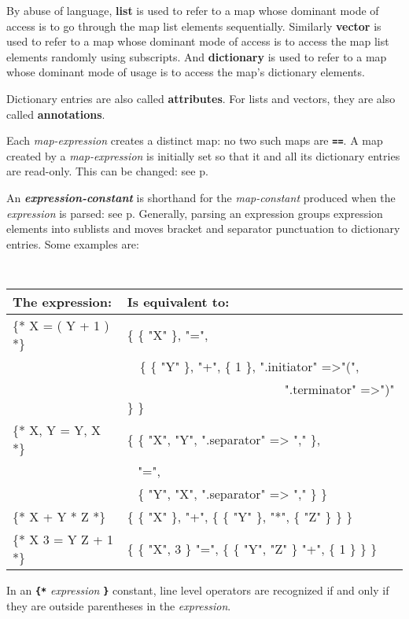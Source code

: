 \documentclass[12pt]{article}
\newcommand{\TT}[1]{{\tt \bfseries #1}}
\newcommand{\key}[1]{{\rm \bfseries #1}}
\newcommand{\emkey}[1]{{\em \bfseries #1}}
\newcommand{\skey}[2]{{\rm \bfseries #1#2}}
\newcommand{\pagref}[1]{p\pageref{#1}}
\begin{document}
By abuse of language, \key{list} is used to refer to a map whose
dominant mode of access is to go through the map list elements
sequentially.  Similarly \key{vector} is used to refer to a map whose
dominant mode of access is to access the map list elements randomly
using subscripts.  And \key{dictionary} is used to refer to a map
whose dominant mode of usage is to access the map's dictionary elements.

Dictionary entries are also called \skey{attribute}s.  For lists and
vectors, they are also called \skey{annotation}s.

Each {\em map-expression}
creates a distinct map: no two such maps are \TT{==}.  A map created
by a {\em map-expression} is initially set so that it and all its dictionary
entries are read-only.  This can be changed: see \pagref{READ-ONLY-MAP}.

An \emkey{expression-constant}\label{EXPRESSION-CONSTANT}
is shorthand for the {\em map-constant}
produced when the {\em expression} is parsed: see \pagref{PARSER-OUTPUT}.
Generally, parsing an expression groups expression elements into
sublists and moves bracket and separator punctuation to dictionary entries.
Some examples are:
\begin{center} \tt
\begin{tabular}{l@{~~~}l}
\rm The expression:	& \rm Is equivalent to:
\\\hline
\{* X = ( Y + 1 ) *\}	& \{ \{ "X" \}, "=", \\
			&  ~~\{ \{ "Y" \}, "+", \{ 1 \}, ".initiator" =>"(", \\
			& ~~~~~~~~~~~~~~~~~~~~~~~~~".terminator" =>")" \} \}
\\[0.5ex]
\{* X, Y = Y, X *\}	& \{ \{ "X", "Y", ".separator" => "," \}, \\
			&  ~ "=", \\
			&  ~ \{ "Y", "X", ".separator" => "," \} \}
\\[0.5ex]
\{* X + Y * Z *\}	& \{ \{ "X" \}, "+", \{ \{ "Y" \}, "*", \{ "Z" \} \} \}
\\[0.5ex]
\{* X 3 = Y Z + 1 *\}	& \{ \{ "X", 3 \} "=",
                             \{ \{ "Y", "Z" \} "+", \{ 1 \} \} \}
\end{tabular}
\end{center}
In an \TT{\{*} {\em expression} \TT{*\}} constant,
line level operators are recognized if and only if
they are outside parentheses in the {\em expression}.
\end{document}
